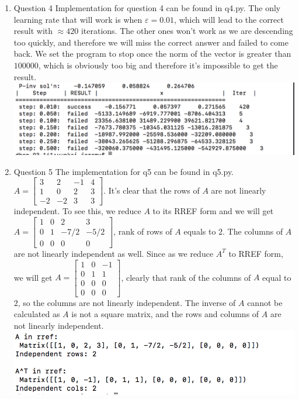 \documentclass[11pt]{article}
\begin{document}
\begin{enumerate}
\item Question 4\newline
Implementation for question 4 can be found in q4.py. The only learning rate that will work is when $ε = 0.01$, which will lead to the correct result with $\approx 420$ iterations. The other ones won't work as we are descending too quickly, and therefore we will miss the correct answer and failed to come back. We set the program to stop once the norm of the vector is greater than $100000$, which is obviously too big and therefore it's impossible to get the result.
\includegraphics{q4_result}

\item Question 5\newline
The implementation for q5 can be found in q5.py. $A = \begin{bmatrix} 3 & 2 & -1 & 4 \\ 1 & 0 & 2 & 3 \\ -2 & -2 & 3 & 3\end{bmatrix}$. It's clear that the rows of $A$ are not linearly independent. To see this, we reduce $A$ to its RREF form and we will get $A = \begin{bmatrix} 1 & 0 & 2 & 3 \\ 0 & 1 & -7/2 & -5/2 \\ 0 & 0 & 0 & 0\end{bmatrix}$, rank of rows of $A$ equals to $2$. The columns of $A$ are not linearly independent as well. Since as we reduce $A^T$ to RREF form, we will get $A = \begin{bmatrix} 1 &0 & -1 \\ 0 & 1 & 1 \\ 0 & 0 & 0 \\ 0 & 0 & 0\end{bmatrix}$, clearly that rank of the columns of $A$ equal to $2$, so the columns are not linearly independent. The inverse of $A$ cannot be calculated as $A$ is not a square matrix, and the rows and columns of $A$ are not linearly independent.\\
\includegraphics{q5_result}


\end{enumerate}
\end{document}
